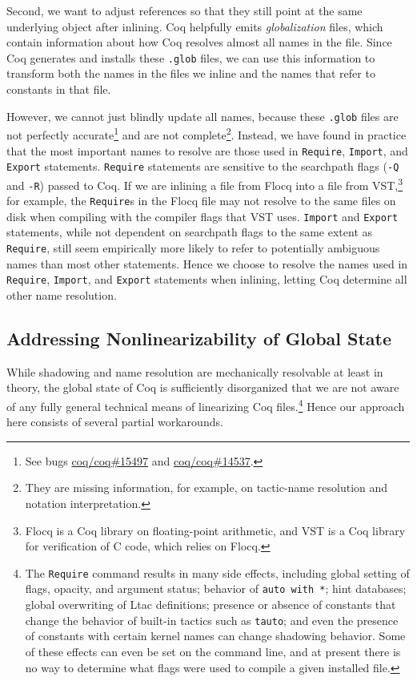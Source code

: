\documentclass[a4paper,USenglish,cleveref,autoref,thm-restate,pdfa]{lipics-v2021}
\newcommand{\coqbug}[1]{\href{https://github.com/coq/coq/issues/#1}{coq/coq\##1}}
\begin{document}
Second, we want to adjust references so that they still point at the same underlying object after inlining.
Coq helpfully emits \emph{globalization} files, which contain information about how Coq resolves almost all names in the file.
Since Coq generates and installs these \texttt{.glob} files, we can use this information to transform both the names in the files we inline and the names that refer to constants in that file.

However, we cannot just blindly update all names, because these \texttt{.glob} files are not perfectly accurate\footnote{See bugs \coqbug{15497} and \coqbug{14537}.} and are not complete\footnote{They are missing information, for example, on tactic-name resolution and notation interpretation.}.
Instead, we have found in practice that the most important names to resolve are those used in \texttt{Require}, \texttt{Import}, and \texttt{Export} statements.
\texttt{Require} statements are sensitive to the searchpath flags (\verb|-Q| and \verb|-R|) passed to Coq.
If we are inlining a file from Flocq into a file from VST,\footnote{Flocq is a Coq library on floating-point arithmetic, and VST is a Coq library for verification of C code, which relies on Flocq.} for example, the \texttt{Require}s in the Flocq file may not resolve to the same files on disk when compiling with the compiler flags that VST uses.
\texttt{Import} and \texttt{Export} statements, while not dependent on searchpath flags to the same extent as \texttt{Require}, still seem empirically more likely to refer to potentially ambiguous names than most other statements.
Hence we choose to resolve the names used in \texttt{Require}, \texttt{Import}, and \texttt{Export} statements when inlining, letting Coq determine all other name resolution.

\subsection{Addressing Nonlinearizability of Global State}\label{sec:linearize-global-state}
While shadowing and name resolution are mechanically resolvable at least in theory, the global state of Coq is sufficiently disorganized that we are not aware of any fully general technical means of linearizing Coq files.\footnote{%
The \texttt{Require} command results in many side effects, including global setting of flags, opacity, and argument status; behavior of \texttt{auto with *}; hint databases; global overwriting of Ltac definitions; presence or absence of constants that change the behavior of built-in tactics such as \texttt{tauto}; and even the presence of constants with certain kernel names can change shadowing behavior.
Some of these effects can even be set on the command line, and at present there is no way to determine what flags were used to compile a given installed file.
}
Hence our approach here consists of several partial workarounds.
\end{document}
